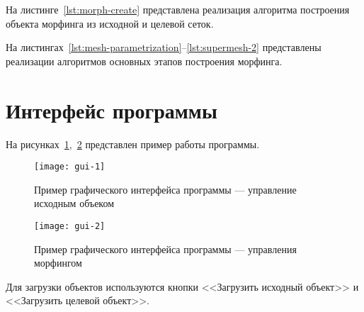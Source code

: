 На листинге~\ref{lst:morph-create} представлена реализация алгоритма построения объекта морфинга из исходной и целевой сеток.


На листингах~\ref{lst:mesh-parametrization}--\ref{lst:supermesh-2} представлены реализации алгоритмов основных этапов построения морфинга.












\section{Интерфейс программы}

На рисунках~\ref{fig:gui-1},~\ref{fig:gui-2} представлен пример работы программы.

\begin{figure}[H]
    \label{fig:gui-1}
    \centering
    \texttt{[image: gui-1]}
    \caption{Пример графического интерфейса программы --- управление исходным объеком}
\end{figure}

\begin{figure}[H]
    \label{fig:gui-2}
    \centering
    \texttt{[image: gui-2]}
    \caption{Пример графического интерфейса программы --- управления морфингом}
\end{figure}

Для загрузки объектов используются кнопки <<Загрузить исходный объект>> и <<Загрузить целевой объект>>.

